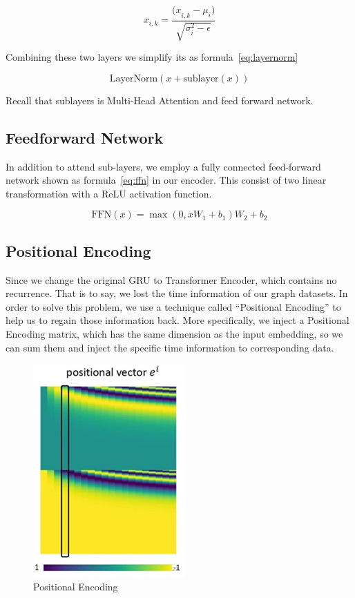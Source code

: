 \documentclass{article}
\begin{document}
\begin{equation}
    \label{eq:norm}
    x_{i,k}=\frac{{(x}_{i,k}-\mu_i)}{\sqrt{\sigma_i^2-\epsilon}}
\end{equation}

Combining these two layers we simplify its as formula~\ref{eq:layernorm}

\begin{equation}
    \label{eq:layernorm}
    \textrm{LayerNorm}\left(x+\textrm{sublayer}(x)\right)
\end{equation}

Recall that sublayers is Multi-Head Attention and feed forward network.

\subsection{Feedforward Network}

In addition to attend sub-layers,
we employ a fully connected feed-forward network
shown as formula~\ref{eq:ffn} in our encoder.
This consist of two linear transformation with a ReLU activation function.

\begin{equation}
    \label{eq:ffn}
    \textrm{FFN}\left(x\right)=\max{\left(0,xW_1+b_1\right)}W_2+b_2
\end{equation}

\subsection{Positional Encoding}

Since we change the original GRU to Transformer Encoder,
which contains no recurrence. That is to say,
we lost the time information of our graph datasets.
In order to solve this problem,
we use a technique called “Positional Encoding” to help us
to regain those information back. More specifically,
we inject a Positional Encoding matrix,
which has the same dimension as the input embedding,
so we can sum them and inject the specific time information
to corresponding data.

\begin{figure}
    \centering
    \includegraphics[scale=0.6]{pos}
    \caption{Positional Encoding}
    \label{fig:pos_encoding}
\end{figure}
\end{document}
